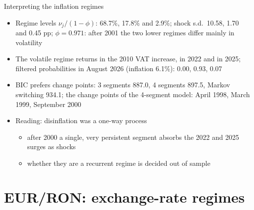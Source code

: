 \begin{frame}{Interpreting the inflation regimes}
\itemsize{\small}
\begin{itemize}
    \item Regime levels $\nu_j/(1 - \phi)$: 68.7\%, 17.8\% and 2.9\%; shock s.d.\ 10.58, 1.70 and 0.45 pp; $\phi = 0.971$: after 2001 the two lower regimes differ mainly in volatility
    \item The volatile regime returns in the 2010 VAT increase, in 2022 and in 2025; filtered probabilities in August 2026 (inflation 6.1\%): 0.00, 0.93, 0.07
    \item BIC prefers change points: 3 segments 887.0, 4 segments 897.5, Markov switching 934.1; the change points of the 4-segment model: April 1998, March 1999, September 2000
    \item Reading: disinflation was a one-way process
    \begin{itemize}
        \item after 2000 a single, very persistent segment absorbs the 2022 and 2025 surges as shocks
        \item whether they are a recurrent regime is decided out of sample
    \end{itemize}
\end{itemize}
\end{frame}


\section{EUR/RON: exchange-rate regimes}

